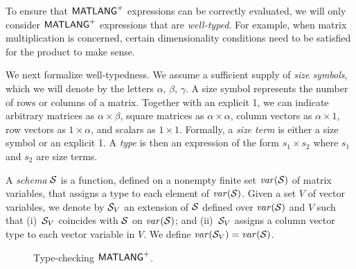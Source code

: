 To ensure that $\mathsf{MATLANG}^{\sf +}$ expressions can be correctly evaluated, we will only consider $\mathsf{MATLANG}^{\sf +}$ expressions that are \textit{well-typed}. For example, when matrix multiplication is concerned, certain dimensionality conditions need to be satisfied for the product to make sense.


We next formalize well-typedness.
We assume a sufficient supply of \textit{size symbols},
which we will denote by the letters $\alpha$, $\beta$, $\gamma$.
A size symbol represents the number of rows or columns of a
matrix.  Together with an explicit 1, we can indicate
arbitrary matrices as $\alpha \times \beta$, square matrices as
$\alpha \times \alpha$, column vectors as $\alpha \times 1$, row
vectors as $1 \times \alpha$, and scalars as $1 \times 1$.
Formally, a \textit{size term} is either a size symbol or an
explicit 1.  A \textit{type} is then an expression of the form $s_1
\times s_2$ where $s_1$ and $s_2$ are size terms.  

A \textit{schema} $\mathcal{S}$ is a function, defined on a nonempty finite
set $\operatorname{\mathit{var}}(\mathcal{S})$ of matrix variables, that assigns a type to each
element of $\operatorname{\mathit{var}}(\mathcal{S})$. Given a set $V$ of vector variables, 
we denote by $\mathcal{S}_V$ an extension of $\mathcal{S}$ defined over $\operatorname{\mathit{var}}(\mathcal{S})$ and $V$
such that (i)~$\mathcal{S}_V$
coincides with $\mathcal{S}$ on $\operatorname{\mathit{var}}(\mathcal{S})$; and (ii)~$\mathcal{S}_V$ assigns 
a column vector type  to each vector variable
in $V$. We define $\operatorname{\mathit{var}}(\mathcal{S}_V)=\operatorname{\mathit{var}}(\mathcal{S})$.

\begin{figure}
  \caption{Type-checking $\mathsf{MATLANG}^{\sf +}$.}
  \label{fig:matlangplus-type-rules}
\end{figure}



